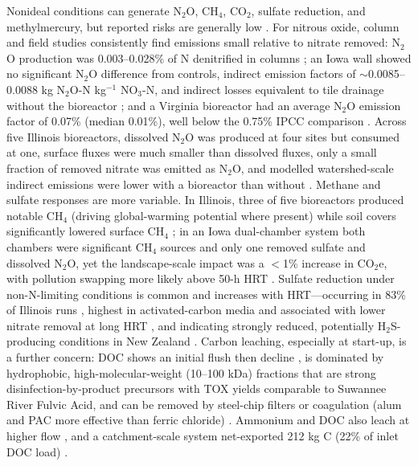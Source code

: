 Nonideal conditions can generate N$_2$O, CH$_4$, CO$_2$, sulfate reduction, and methylmercury, but reported risks are generally low \parencite{Hartfiel2022}. For nitrous oxide, column and field studies consistently find emissions small relative to nitrate removed: N$_2$O production was 0.003--0.028\% of N denitrified in columns \parencite{Greenan2009}; an Iowa wall showed no significant N$_2$O difference from controls, indirect emission factors of $\sim$0.0085--0.0088 kg N$_2$O-N kg$^{-1}$ NO$_3$-N, and indirect losses equivalent to tile drainage without the bioreactor \parencite{Moorman2010}; and a Virginia bioreactor had an average N$_2$O emission factor of 0.07\% (median 0.01\%), well below the 0.75\% IPCC comparison \parencite{Bock2018}. Across five Illinois bioreactors, dissolved N$_2$O was produced at four sites but consumed at one, surface fluxes were much smaller than dissolved fluxes, only a small fraction of removed nitrate was emitted as N$_2$O, and modelled watershed-scale indirect emissions were lower with a bioreactor than without \parencite{Brunton2024}. Methane and sulfate responses are more variable. In Illinois, three of five bioreactors produced notable CH$_4$ (driving global-warming potential where present) while soil covers significantly lowered surface CH$_4$ \parencite{Brunton2024}; in an Iowa dual-chamber system both chambers were significant CH$_4$ sources and only one removed sulfate and dissolved N$_2$O, yet the landscape-scale impact was a $<$1\% increase in CO$_2$e, with pollution swapping more likely above 50-h HRT \parencite{Hartfiel2023b}. Sulfate reduction under non-N-limiting conditions is common and increases with HRT---occurring in 83\% of Illinois runs \parencite{Bell2015}, highest in activated-carbon media and associated with lower nitrate removal at long HRT \parencite{Povilaitis2020}, and indicating strongly reduced, potentially H$_2$S-producing conditions in New Zealand \parencite{Rivas2020}. Carbon leaching, especially at start-up, is a further concern: DOC shows an initial flush then decline \parencite{Abusallout2017,Rivas2020}, is dominated by hydrophobic, high-molecular-weight (10--100 kDa) fractions that are strong disinfection-by-product precursors with TOX yields comparable to Suwannee River Fulvic Acid, and can be removed by steel-chip filters or coagulation (alum and PAC more effective than ferric chloride) \parencite{Abusallout2017}. Ammonium and DOC also leach at higher flow \parencite{Greenan2009}, and a catchment-scale system net-exported 212 kg C (22\% of inlet DOC load) \parencite{Feyereisen2023}.

